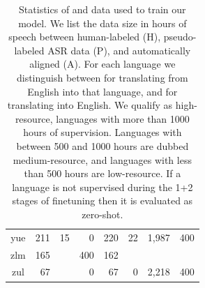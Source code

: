 \begin{table}[!htb]
\begin{minipage}[t]{0.45\textwidth}
\begin{tabular}{@{}crrrrrrr@{}}
        yue & 211 & 15 & 0 & 220 & 22 & 1,987 & 400 \\
        zlm & 165 &  & 400 & 162 &  &  &  \\
        zul & 67 &  & 0 & 67 & 0 & 2,218 & 400 \\
        \bottomrule
    \end{tabular}
    \end{minipage}\hfill
\caption{\small Statistics of \asr{} and \st{} data used to train our \mfourt{} model. We list the data size in hours of speech between human-labeled (H),
pseudo-labeled ASR data (P),
and automatically aligned (A). For each language we distinguish between \engx{} for translating from English into that language, and \xeng{} for translating into English.
We qualify as high-resource, languages with more than 1000 hours of supervision. Languages with between 500 and 1000 hours are dubbed medium-resource, and languages with less than 500 hours are low-resource. If a language is not supervised during the 1+2 stages of finetuning then it is evaluated as zero-shot.
}
\label{tbl:offline:s2tdata}
\end{table}
\restoregeometry